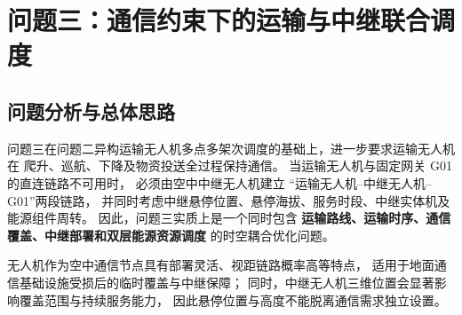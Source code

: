
\newcommand{\QThreeSeed}{20260924}
\newcommand{\QThreeTransportIter}{0}
\newcommand{\QThreeJointIter}{20}

\newcommand{\QThreeBaseLate}{1131.054}
\newcommand{\QThreeBaseMakespan}{26461.112}
\newcommand{\QThreeBaseMakespanHour}{7.350}
\newcommand{\QThreeBaseEnergy}{90.744}
\newcommand{\QThreeBaseTrips}{38}

\newcommand{\QThreeLate}{752.950}
\newcommand{\QThreeMakespan}{26243.895}
\newcommand{\QThreeMakespanHour}{7.290}
\newcommand{\QThreeTransportEnergy}{83.015}
\newcommand{\QThreeRelayEnergy}{7.060}
\newcommand{\QThreeEnergy}{90.075}
\newcommand{\QThreeTransportTrips}{25}
\newcommand{\QThreeRelayTrips}{13}
\newcommand{\QThreeTrips}{38}
\newcommand{\QThreeHardViolation}{0}
\newcommand{\QThreeCommOutage}{0}
\newcommand{\QThreeScore}{0.846041}

\newcommand{\QThreeLateImprove}{33.43\%}
\newcommand{\QThreeMakespanImprove}{0.82\%}
\newcommand{\QThreeEnergyImprove}{0.74\%}
\newcommand{\QThreeScoreImprove}{15.40\%}

\section{问题三：通信约束下的运输与中继联合调度}
\label{sec:q3}

\subsection{问题分析与总体思路}

问题三在问题二异构运输无人机多点多架次调度的基础上，进一步要求运输无人机在
爬升、巡航、下降及物资投送全过程保持通信。
当运输无人机与固定网关 G01 的直连链路不可用时，
必须由空中中继无人机建立
“运输无人机--中继无人机--G01”两段链路，
并同时考虑中继悬停位置、悬停海拔、服务时段、中继实体机及能源组件周转。
因此，问题三实质上是一个同时包含
\textbf{运输路线、运输时序、通信覆盖、中继部署和双层能源资源调度}
的时空耦合优化问题。

无人机作为空中通信节点具有部署灵活、视距链路概率高等特点，
适用于地面通信基础设施受损后的临时覆盖与中继保障\cite{q3-zeng2016}；
同时，中继无人机三维位置会显著影响覆盖范围与持续服务能力，
因此悬停位置与高度不能脱离通信需求独立设置\cite{q3-mozaffari2016}。

